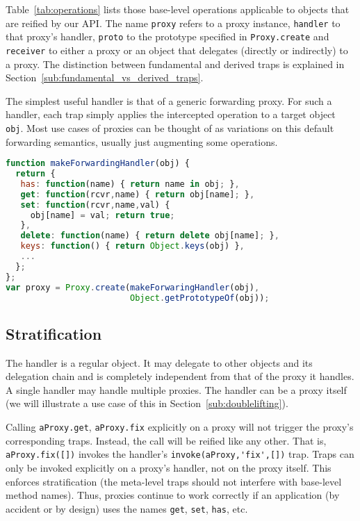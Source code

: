 \documentclass{acm_proc_article-sp}
\begin{document}
Table~\ref{tab:operations} lists those base-level operations applicable to objects that are reified by our API. The name \texttt{proxy} refers to a proxy instance, \texttt{handler} to that proxy's handler, \texttt{proto} to the prototype specified in \texttt{Proxy.create} and \texttt{receiver} to either a proxy or an object that delegates (directly or indirectly) to a proxy. The distinction between fundamental and derived traps is explained in Section~\ref{sub:fundamental_vs_derived_traps}.

The simplest useful handler is that of a generic forwarding proxy. For such a handler, each trap simply applies the intercepted operation to a target object \texttt{obj}. Most use cases of proxies can be thought of as variations on this default forwarding semantics, usually just augmenting some operations.

\begin{lstlisting}[language=javascript]
function makeForwardingHandler(obj) {
  return {
   has: function(name) { return name in obj; },
   get: function(rcvr,name) { return obj[name]; },
   set: function(rcvr,name,val) {
     obj[name] = val; return true;
   },
   delete: function(name) { return delete obj[name]; },
   keys: function() { return Object.keys(obj) },
   ...
  };
};
var proxy = Proxy.create(makeForwaringHandler(obj),
                         Object.getPrototypeOf(obj));
\end{lstlisting}

\subsection{Stratification}

The handler is a regular object. It may delegate to other objects and its delegation chain and is completely independent from that of the proxy it handles. A single handler may handle multiple proxies. The handler can be a proxy itself (we will illustrate a use case of this in Section~\ref{sub:doublelifting}).

Calling \lstinline{aProxy.get}, \lstinline{aProxy.fix} explicitly on a proxy will not trigger the proxy's corresponding traps. Instead, the call will be reified like any other. That is, \lstinline{aProxy.fix([])} invokes the handler's \lstinline{invoke(aProxy,'fix',[])} trap. Traps can only be invoked explicitly on a proxy's handler, not on the proxy itself. This enforces stratification (the meta-level traps should not interfere with base-level method names). Thus, proxies continue to work correctly if an application (by accident or by design) uses the names \texttt{get}, \texttt{set}, \texttt{has}, etc.
\end{document}
